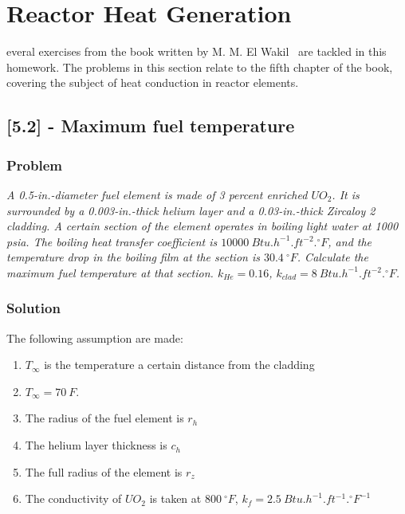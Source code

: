 %
%
\let\textcircled=\pgftextcircled
\chapter{Reactor Heat Generation}
\label{chap:intro}

everal exercises from the book written by M. M. El Wakil~\cite{book01} are tackled in this homework. The problems in this section relate to the fifth chapter of the book, covering the subject of heat conduction in reactor elements.

\section{[5.2] - Maximum fuel temperature}
\label{prob51}

\subsection{Problem}
\textit{A 0.5-in.-diameter fuel element is made of 3 percent enriched $UO_2$. It is surrounded by a 0.003-in.-thick helium layer and a 0.03-in.-thick Zircaloy 2 cladding. A certain section of the element operates in boiling light water at 1000 psia. The boiling heat transfer coefficient is $10000\ Btu.h^{-1}.ft^{-2}.{}^\circ F$, and the temperature drop in the boiling film at the section is $30.4\ {}^\circ F$. Calculate the maximum fuel temperature at that section. $k_{He}=0.16$, $k_{clad} = 8\ Btu.h^{-1}.ft^{-2}.^\circ F$.}

\subsection{Solution}


The following assumption are made:

\begin{enumerate}
\item $T_{\infty}$ is the temperature a certain distance from the cladding
\item $T_{\infty} = 70\ F$.
\item The radius of the fuel element is $r_h$
\item The helium layer thickness is $c_h$
\item The full radius of the element is $r_z$
\item The conductivity of $UO_2$ is taken at $800\ ^\circ F$, $k_f = 2.5\ Btu.h^{-1}.ft^{-1}.{}^\circ F^{-1}$
\end{enumerate}

